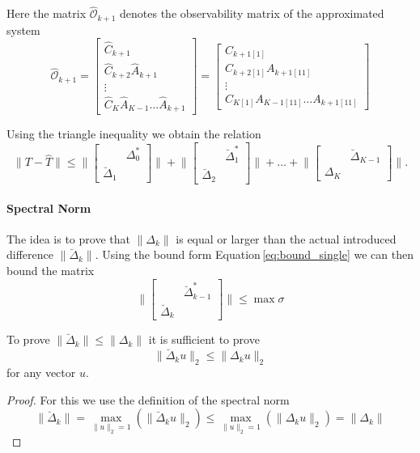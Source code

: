 \documentclass[doctype=mastersthesis,BCOR=15mm,biblatex]{ldvbook}%
\newcommand{\Ob}{\mathcal{O}} %
\begin{document}
Here the matrix $\hat{\Ob}_{k+1}$ denotes the observability matrix of the approximated system 
\begin{equation}
\hat{\Ob}_{k+1}=
\begin{bmatrix}
\hat{C}_{k+1}\\
\hat{C}_{k+2}\hat{A}_{k+1}\\
\vdots \\
\hat{C}_{K} \hat{A}_{K-1} \dots \hat{A}_{k+1}
\end{bmatrix}
=
\begin{bmatrix}
C_{k+1[1]}\\
C_{k+2[1]}A_{k+1[11]}\\
\vdots\\
C_{K[1]}A_{K-1[11]}\dots A_{k+1[11]}
\end{bmatrix}
\end{equation}

Using the triangle inequality we obtain the relation
\begin{equation}
\|T-\hat{T}\| \leq
\Bigg\|
\begin{bmatrix}
&\Delta_0^*\\
\breve{\Delta}_1
\end{bmatrix}
\Bigg\|+\Bigg\|
\begin{bmatrix}
&\breve{\Delta}_1^*\\
\breve{\Delta}_2
\end{bmatrix}
\Bigg\|+\dots+\Bigg\|
\begin{bmatrix}
&\breve{\Delta}_{K-1}\\
\Delta_K
\end{bmatrix}
\Bigg\|.
\end{equation}

\paragraph{Spectral Norm}
The idea is to prove that $\|\Delta_k\|$ is equal or larger than the actual introduced difference $\|\breve{\Delta}_k\|$.
Using the bound form Equation\,\ref{eq:bound_single} we can then bound the matrix
\begin{equation}
\Bigg\|
\begin{bmatrix}
& \breve{\Delta}_{k-1}^*\\
\breve{\Delta}_k
\end{bmatrix}
\Bigg\| \leq \max{\sigma}
\end{equation}

To prove $\|\breve{\Delta}_k\| \leq \|\Delta_k\|$ it is sufficient to prove
\begin{equation}\label{eq:A_breve_leq_delta}
	\|\breve{\Delta}_k u\|_2 \leq \|\Delta_k u\|_2 
\end{equation}
for any vector $u$.
\begin{proof}
	For this we use the definition of the spectral norm
	\begin{equation}
		\|\breve{\Delta}_k\| =
		\underset{\|u\|_2 = 1}{\max}(\|\breve{\Delta}_k u\|_2)
		\leq 
		\underset{\|u\|_2 = 1}{\max}(\|\Delta_k u\|_2)
		=\|\Delta_k\|
	\end{equation}
\end{proof}
\end{document}
